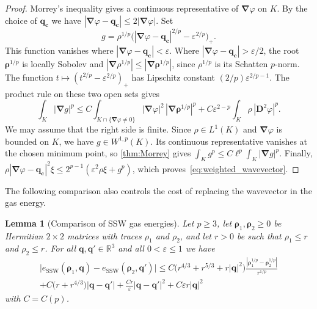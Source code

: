 \documentclass[final,reqno]{amsart}
\newtheorem{lemma}[theorem]{Lemma}
\theoremstyle{remark}
\renewcommand{\le}{\leqslant}
\renewcommand{\ge}{\geqslant}
\renewcommand{\epsilon}{\varepsilon}
\newcommand{\RR}{\mathbb{R}}
\newcommand{\SSW}{\mathrm{SSW}}
\newcommand{\grad}{\bm{\nabla}}
\begin{document}
\begin{proof}
Morrey's inequality gives a continuous representative of $\grad\varphi$ on $K$. By the choice of $\mathbf{q}_{\mathbf{c}}$ we have $|\grad\varphi-\mathbf{q}_{\mathbf{c}}|\le2|\grad\varphi|$. Set
\[
g=\rho^{1/p}\big(|\grad\varphi-\mathbf{q}_{\mathbf{c}}|^{2/p}-\epsilon^{2/p}\big)_+ .
\]
This function vanishes where $|\grad\varphi-\mathbf{q}_{\mathbf{c}}|<\epsilon$. Where $|\grad\varphi-\mathbf{q}_{\mathbf{c}}|>\epsilon/2$, the root $\bm{\rho}^{1/p}$ is locally Sobolev and $|\grad\rho^{1/p}|\le|\grad\bm{\rho}^{1/p}|$, since $\rho^{1/p}$ is its Schatten $p$-norm. The function $t\mapsto(t^{2/p}-\epsilon^{2/p})_+$ has Lipschitz constant $(2/p)\epsilon^{2/p-1}$. The product rule on these two open sets gives
\[
\int_K|\grad g|^p\le C\int_{K\cap\{\grad\varphi\ne0\}}|\grad\varphi|^2\,|\grad\bm{\rho}^{1/p}|^p
+C\epsilon^{2-p}\int_K\rho\,|\mathbf{D}^2\varphi|^p .
\]
We may assume that the right side is finite. Since $\rho\in L^1(K)$ and $\grad\varphi$ is bounded on $K$, we have $g\in W^{1,p}(K)$. Its continuous representative vanishes at the chosen minimum point, so \cref{thm:Morrey} gives $\int_K g^p\le C\ell^p\int_K|\grad g|^p$. Finally,
$\rho|\grad\varphi-\mathbf{q}_{\mathbf{c}}|^2\xi\le 2^{p-1}(\epsilon^2\rho\xi+g^p)$, which proves~\cref{eq:weighted_wavevector}.
\end{proof}

The following comparison also controls the cost of replacing the wavevector in the gas energy.

\begin{lemma}[Comparison of SSW gas energies]\label{lem:compare_SSW}
Let $p\ge3$, let $\bm{\rho}_1,\bm{\rho}_2\ge0$ be Hermitian $2\times2$ matrices with traces $\rho_1$ and $\rho_2$, and let $r>0$ be such that $\rho_1\le r$ and $\rho_2\le r$. For all $\mathbf{q},\mathbf{q}'\in\RR^3$ and all $0<\epsilon\le1$ we have
\begin{multline}\label{eq:compare_SSW}
\big|e_\SSW(\bm{\rho}_1,\mathbf{q})-e_\SSW(\bm{\rho}_2,\mathbf{q}')\big|\le C\big(r^{4/3}+r^{5/3}+r|\mathbf{q}|^2\big)\frac{|\bm{\rho}_1^{1/p}-\bm{\rho}_2^{1/p}|}{r^{1/p}}\\
+C\big(r+r^{4/3}\big)|\mathbf{q}-\mathbf{q}'|+\frac{Cr}{\epsilon}|\mathbf{q}-\mathbf{q}'|^2+C\epsilon r|\mathbf{q}|^2
\end{multline}
with $C=C(p)$.
\end{lemma}
\end{document}
